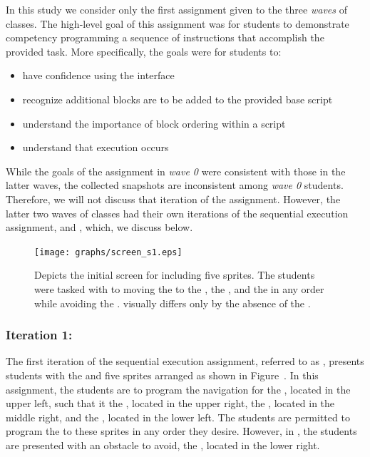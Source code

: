 In this study we consider only the first assignment given to the three
\emph{waves} of classes. The high-level goal of this assignment was for
students to demonstrate competency programming a sequence of instructions that
accomplish the provided task. More specifically, the goals were for students
to:

\begin{itemize}
\item have confidence using the interface
\item recognize additional blocks are to be added to the provided base script
\item understand the importance of block ordering within a script
\item understand that execution occurs \netclicked{}
\end{itemize}

While the goals of the assignment in \emph{wave 0} were consistent with those
in the latter waves, the collected snapshots are inconsistent among \emph{wave
  0} students. Therefore, we will not discuss that iteration of the
assignment. However, the latter two waves of classes had their own iterations
of the sequential execution assignment, \sone{} and \stwo{}, which, we discuss
below.

\begin{figure}[!t]
\centering
\texttt{[image: graphs/screen\_s1.eps]}
\caption{Depicts the initial screen for \sone{} including five sprites. The
  students were tasked with to moving the \net{} to \catch{} the \bear{}, the
  \horse{}, and the \zebra{} in any order while avoiding the \snake{}. \stwo{}
  visually differs only by the absence of the \snake{}.}
\end{figure}

\subsubsection{Iteration 1: \sone{}} 
The first iteration of the sequential execution assignment, referred to as
\sone{}, presents students with the \stage{} and five sprites arranged as shown
in Figure~. In this assignment, the students are to
program the navigation for the \net{}, located in the upper left, such that it
 the \bear{}, located in the upper right, the \horse{}, located in
the middle right, and the \zebra{}, located in the lower left. The students are
permitted to program the \net{} to \catch{} these sprites in any order they
desire. However, in \sone{}, the students are presented with an obstacle to
avoid, the \snake{}, located in the lower right.

